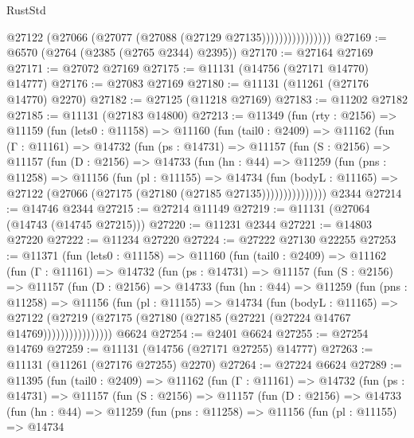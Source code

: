 \begin{lexlean}{RustStd}
\begin{coremodule}
                          @27122 (@27066 (@27077 (@27088 (@27129 @27135))))))))))))))))
@27169 := @6570 (@2764 (@2385 (@2765 @2344) @2395))
@27170 := @27164 @27169
@27171 := @27072 @27169
@27175 := @11131 (@14756 (@27171 @14770) @14777)
@27176 := @27083 @27169
@27180 := @11131 (@11261 (@27176 @14770) @2270)
@27182 := @27125 (@11218 @27169)
@27183 := @11202 @27182
@27185 := @11131 (@27183 @14800)
@27213 := @11349
    (fun (rty : @2156) =>
    @11159
      (fun (lets0 : @11158) =>
      @11160
        (fun (tail0 : @2409) =>
        @11162
          (fun (Γ : @11161) =>
          @14732
            (fun (ps : @14731) =>
            @11157
              (fun (S : @2156) =>
              @11157
                (fun (D : @2156) =>
                @14733
                  (fun (hn : @44) =>
                  @11259
                    (fun (pns : @11258) =>
                    @11156
                      (fun (pl : @11155) =>
                      @14734
                        (fun (bodyL : @11165) =>
                        @27122 (@27066 (@27175 (@27180 (@27185 @27135)))))))))))))))
    @2344
@27214 := @14746 @2344
@27215 := @27214 @11149
@27219 := @11131 (@27064 (@14743 (@14745 @27215)))
@27220 := @11231 @2344
@27221 := @14803 @27220
@27222 := @11234 @27220
@27224 := @27222 @27130 @22255
@27253 := @11371
    (fun (lets0 : @11158) =>
    @11160
      (fun (tail0 : @2409) =>
      @11162
        (fun (Γ : @11161) =>
        @14732
          (fun (ps : @14731) =>
          @11157
            (fun (S : @2156) =>
            @11157
              (fun (D : @2156) =>
              @14733
                (fun (hn : @44) =>
                @11259
                  (fun (pns : @11258) =>
                  @11156
                    (fun (pl : @11155) =>
                    @14734
                      (fun (bodyL : @11165) =>
                      @27122
                        (@27219
                          (@27175 (@27180 (@27185 (@27221 (@27224 @14767 @14769))))))))))))))))
    @6624
@27254 := @2401 @6624
@27255 := @27254 @14769
@27259 := @11131 (@14756 (@27171 @27255) @14777)
@27263 := @11131 (@11261 (@27176 @27255) @2270)
@27264 := @27224 @6624
@27289 := @11395
    (fun (tail0 : @2409) =>
    @11162
      (fun (Γ : @11161) =>
      @14732
        (fun (ps : @14731) =>
        @11157
          (fun (S : @2156) =>
          @11157
            (fun (D : @2156) =>
            @14733
              (fun (hn : @44) =>
              @11259
                (fun (pns : @11258) =>
                @11156
                  (fun (pl : @11155) =>
                  @14734

\end{coremodule}
\end{lexlean}

